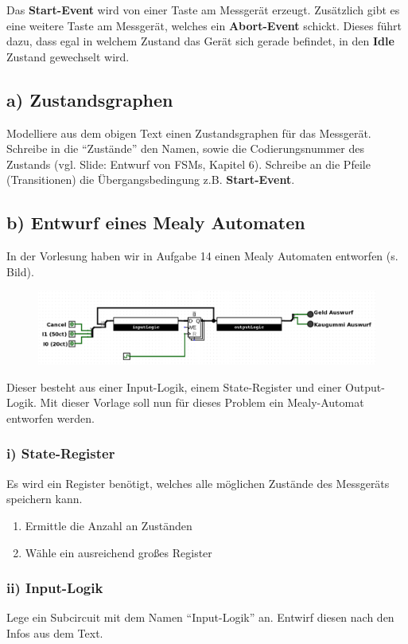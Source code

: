 \documentclass[a4paper]{scrartcl}
\begin{document}
Das \textbf{Start-Event} wird von einer Taste am Messgerät erzeugt. Zusätzlich gibt es eine weitere Taste am Messgerät, welches ein \textbf{Abort-Event} schickt. Dieses
führt dazu, dass egal in welchem Zustand das Gerät sich gerade befindet, in den \textbf{Idle} Zustand gewechselt wird.


\subsection*{a) Zustandsgraphen}
Modelliere aus dem obigen Text einen Zustandsgraphen für das Messgerät. Schreibe in die ``Zustände'' den Namen, sowie die Codierungsnummer des Zustands 
(vgl. Slide: Entwurf von FSMs, Kapitel 6). Schreibe an die Pfeile (Transitionen) die Übergangsbedingung z.B. \textbf{Start-Event}.

\subsection*{b) Entwurf eines Mealy Automaten}
In der Vorlesung haben wir in Aufgabe 14 einen Mealy Automaten entworfen (s. Bild).
\begin{figure}[h!]
  \centering
  \includegraphics[width=\textwidth]{mealy.png}
\end{figure}

Dieser besteht aus einer Input-Logik, einem State-Register und einer Output-Logik. Mit dieser Vorlage soll nun für dieses Problem ein Mealy-Automat entworfen werden.

\subsubsection*{i) State-Register}
Es wird ein Register benötigt, welches alle möglichen Zustände des Messgeräts speichern kann.
\begin{enumerate}
  \item Ermittle die Anzahl an Zuständen
  \item Wähle ein ausreichend großes Register
\end{enumerate}


\subsubsection*{ii) Input-Logik}
Lege ein Subcircuit mit dem Namen ``Input-Logik'' an. Entwirf diesen nach den Infos aus dem Text.\\
\end{document}
